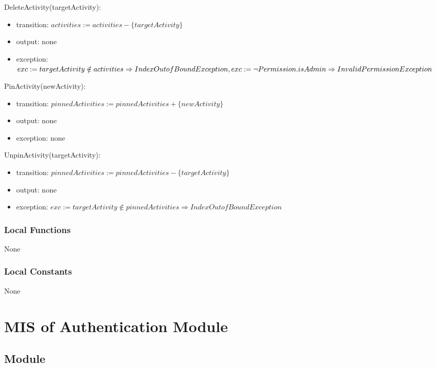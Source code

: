 \documentclass[12pt, titlepage]{article}
\begin{document}
\noindent DeleteActivity(targetActivity):
\begin{itemize}
\item transition: $activities := activities - \{targetActivity\}$
\item output: none
\item exception: $exc := targetActivity \notin activities \Rightarrow IndexOutofBound Exception,\\
                  exc := \neg Permission.isAdmin \Rightarrow InvalidPermission Exception$
\end{itemize}

\noindent PinActivity(newActivity):
\begin{itemize}
\item transition: $pinnedActivities := pinnedActivities + \{newActivity\}$
\item output: none
\item exception: none
\end{itemize}

\noindent UnpinActivity(targetActivity):
\begin{itemize}
\item transition: $pinnedActivities := pinnedActivities - \{targetActivity\}$
\item output: none
\item exception: $exc := targetActivity \notin pinnedActivities \Rightarrow IndexOutofBound Exception$
\end{itemize}

\subsubsection{Local Functions}

None

\subsubsection{Local Constants}

None

\newpage

\section{MIS of Authentication Module} \label{mFM}

\subsection{Module}
\end{document}
